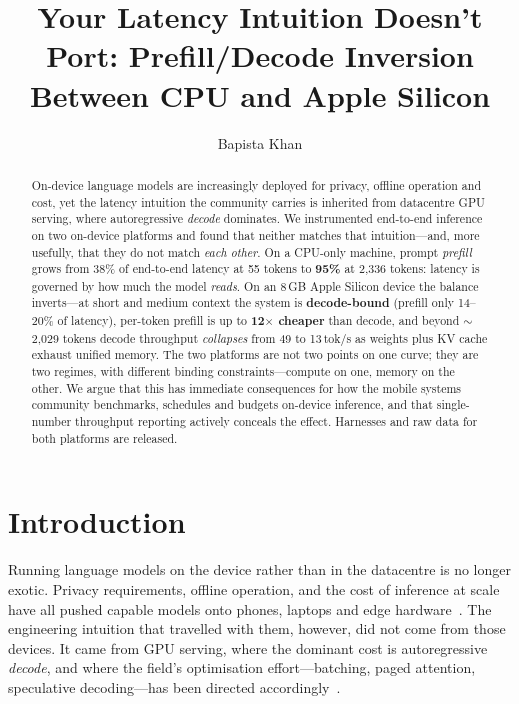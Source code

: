 \documentclass[sigconf,nonacm,10pt]{acmart}
\begin{document}
\title{Your Latency Intuition Doesn't Port: Prefill/Decode Inversion
Between CPU and Apple Silicon}

\author{Bapista Khan}
\renewcommand{\shortauthors}{Bapista Khan}

\begin{abstract}
On-device language models are increasingly deployed for privacy, offline operation and cost, yet the latency
intuition the community carries is inherited from datacentre GPU serving, where autoregressive \emph{decode}
dominates. We instrumented end-to-end inference on two on-device platforms and found that neither matches that
intuition---and, more usefully, that they do not match \emph{each other}. On a CPU-only machine, prompt
\emph{prefill} grows from 38\% of end-to-end latency at 55 tokens to \textbf{95\%} at 2{,}336 tokens: latency is
governed by how much the model \emph{reads}. On an 8\,GB Apple Silicon device the balance inverts---at short and medium
context the system is \textbf{decode-bound} (prefill only 14--20\% of latency), per-token prefill is up to
\textbf{12$\times$ cheaper} than decode, and beyond
$\sim$2{,}029 tokens decode throughput \emph{collapses} from 49 to 13\,tok/s as weights plus KV cache exhaust
unified memory. The two platforms are not two points on one curve; they are two regimes, with different binding
constraints---compute on one, memory on the other. We argue that this has immediate consequences for how the
mobile systems community benchmarks, schedules and budgets on-device inference, and that single-number
throughput reporting actively conceals the effect. Harnesses and raw data for both platforms are released.
\end{abstract}


\maketitle

\section{Introduction}

Running language models on the device rather than in the datacentre is no longer exotic. Privacy requirements,
offline operation, and the cost of inference at scale have all pushed capable models onto phones, laptops and
edge hardware~\cite{xu2024ondevicereview,liu2024mobilellm,xue2024powerinfer2}. The engineering intuition that
travelled with them, however, did not come from those devices. It came from GPU serving, where the dominant
cost is autoregressive \emph{decode}, and where the field's optimisation effort---batching, paged attention,
speculative decoding---has been directed accordingly~\cite{kwon2023pagedattention,leviathan2023speculative}.
\end{document}
